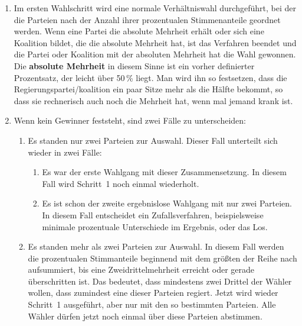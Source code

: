 \begin{enumerate}
  \item Im ersten Wahlschritt wird eine normale Verhältniswahl durchgeführt, bei der die Parteien
    nach der Anzahl ihrer prozentualen Stimmenanteile geordnet werden. Wenn eine Partei die
    absolute Mehrheit erhält oder sich eine Koalition bildet, die die absolute Mehrheit hat, ist
    das Verfahren beendet und die Partei oder Koalition mit der absoluten Mehrheit hat die Wahl
    gewonnen. Die \textbf{absolute Mehrheit} in diesem Sinne ist ein vorher definierter
    Prozentsatz, der leicht über 50\,\% liegt. Man wird ihn so festsetzen, dass die
    Regierungspartei/koalition ein paar Sitze mehr als die Hälfte bekommt, so dass sie
    rechnerisch auch noch die Mehrheit hat, wenn mal jemand krank ist.

  \item Wenn kein Gewinner feststeht, sind zwei Fälle zu unterscheiden:

    \begin{enumerate}
      \item Es standen nur zwei Parteien zur Auswahl. Dieser Fall unterteilt sich wieder in zwei
        Fälle:

        \begin{enumerate}[label=\roman*.]
          \item Es war der erste Wahlgang mit dieser Zusammensetzung. In diesem Fall wird
            Schritt~1 noch einmal wiederholt.

          \item Es ist schon der zweite ergebnislose Wahlgang mit nur zwei Parteien. In diesem
            Fall entscheidet ein Zufallsverfahren, beispielsweise minimale prozentuale
            Unterschiede im Ergebnis, oder das Los.
        \end{enumerate}

      \item Es standen mehr als zwei Parteien zur Auswahl. In diesem Fall werden die prozentualen
        Stimmanteile beginnend mit dem größten der Reihe nach aufsummiert, bis eine
        Zweidrittelmehrheit erreicht oder gerade überschritten ist. Das bedeutet, dass mindestens
        zwei Drittel der Wähler wollen, dass zumindest eine dieser Parteien regiert. Jetzt wird
        wieder Schritt~1 ausgeführt, aber nur mit den so bestimmten Parteien. Alle Wähler dürfen
        jetzt noch einmal über diese Parteien abstimmen.
    \end{enumerate}
\end{enumerate}

